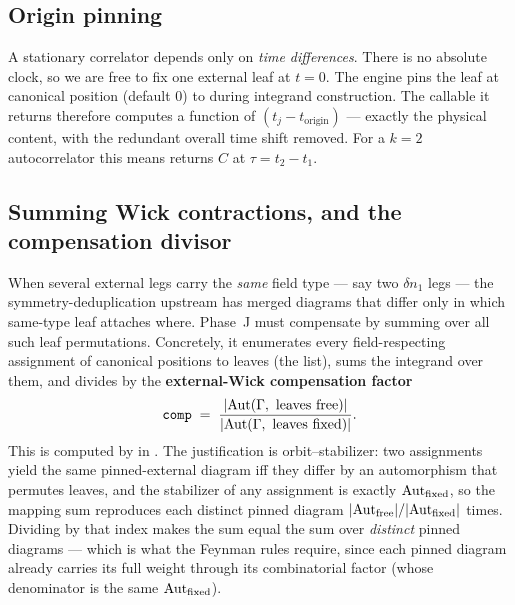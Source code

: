 \subsection{Origin pinning}

A stationary correlator depends only on \emph{time differences}. There is no
absolute clock, so we are free to fix one external leaf at $t=0$. The engine pins
the leaf at canonical position  (default $0$) to
 during integrand construction. The callable it returns therefore
computes a function of $(t_j - t_{\text{origin}})$ --- exactly the physical
content, with the redundant overall time shift removed. For a $k=2$
autocorrelator this means  returns $C$ at
$\tau = t_2 - t_1$.

\subsection{Summing Wick contractions, and the compensation divisor}

When several external legs carry the \emph{same} field type --- say two $\delta
n_1$ legs --- the symmetry-deduplication upstream has merged diagrams that differ
only in which same-type leaf attaches where. Phase~J must compensate by summing
over all such leaf permutations. Concretely, it enumerates every
field-respecting assignment of canonical positions to leaves (the
 list), sums the integrand over them, and divides by the
\textbf{external-Wick compensation factor}
\begin{equation}
  \texttt{comp} \;=\; \frac{|\Aut(\Gamma,\ \text{leaves free})|}{|\Aut(\Gamma,\ \text{leaves fixed})|}.
  \label{eq:wick-comp}
\end{equation}
This is computed by  in
. The justification is orbit--stabilizer: two assignments
yield the same pinned-external diagram iff they differ by an automorphism that
permutes leaves, and the stabilizer of any assignment is exactly
$\mathrm{Aut}_{\text{fixed}}$, so the mapping sum reproduces each distinct pinned diagram
$|\mathrm{Aut}_{\text{free}}|/|\mathrm{Aut}_{\text{fixed}}|$ times. Dividing by that index makes
the sum equal the sum over \emph{distinct} pinned diagrams --- which is what the
Feynman rules require, since each pinned diagram already carries its full weight
through its combinatorial factor (whose denominator is the same
$\mathrm{Aut}_{\text{fixed}}$).

